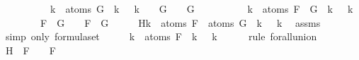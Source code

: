 \begin{isabellebody}
\ \ \ \ \ \ \ \ \ \ {\isachardoublequoteopen}{\isasymforall}k\ {\isasymin}\ atoms\ G{\isachardot}\ {\isasymA}\ k\ {\isacharequal}\ {\isasymA}\ k\ {\isasymLongrightarrow}\ {\isasymA}\ {\isasymTurnstile}\ G\ {\isasymlongleftrightarrow}\ {\isasymA}\ {\isasymTurnstile}\ G{\isachardoublequoteclose}\isanewline
\ \ \ \ \ \ \ \ \ \ {\isachardoublequoteopen}{\isasymforall}k\ {\isasymin}\ atoms\ {\isacharparenleft}F\ \isactrlbold {\isasymrightarrow}\ G{\isacharparenright}{\isachardot}\ {\isasymA}\ k\ {\isacharequal}\ {\isasymA}\ k{\isachardoublequoteclose}\isanewline
\ \ \ \ \ \ {\isachardoublequoteopen}{\isasymA}\ {\isasymTurnstile}\ {\isacharparenleft}F\ \isactrlbold {\isasymrightarrow}\ G{\isacharparenright}\ {\isasymlongleftrightarrow}\ {\isasymA}\ {\isasymTurnstile}\ {\isacharparenleft}F\ \isactrlbold {\isasymrightarrow}\ G{\isacharparenright}{\isachardoublequoteclose}\isanewline
%
\isadelimproof
%
\endisadelimproof
%
\isatagproof
{}\isamarkupfalse%
\ {\isacharminus}\isanewline
\ \ \isamarkupfalse%
\ H{\isacharcolon}{\isachardoublequoteopen}{\isasymforall}k\ {\isasymin}\ atoms\ F\ {\isasymunion}\ atoms\ G{\isachardot}\ {\isasymA}\ k\ {\isacharequal}\ {\isasymA}\ k{\isachardoublequoteclose}\ \isamarkupfalse%
\ assms{\isacharparenleft}{}{\isacharparenright}\isanewline
\ \ \ \ \isamarkupfalse%
\ {\isacharparenleft}simp\ only{\isacharcolon}\ formula{\isachardot}set{\isacharparenleft}{}{\isacharparenright}{\isacharparenright}\isanewline
\ \ \isamarkupfalse%
\ \isamarkupfalse%
\ {\isachardoublequoteopen}{\isasymforall}k\ {\isasymin}\ atoms\ F{\isachardot}\ {\isasymA}\ k\ {\isacharequal}\ {\isasymA}\ k{\isachardoublequoteclose}\isanewline
\ \ \ \ \isamarkupfalse%
\ {\isacharparenleft}rule\ forall{\isacharunderscore}union{}{\isacharparenright}\isanewline
\ \ \isamarkupfalse%
\ \isamarkupfalse%
\ H{}{\isacharcolon}{\isachardoublequoteopen}{\isasymA}\ {\isasymTurnstile}\ F\ {\isasymlongleftrightarrow}\ {\isasymA}\ {\isasymTurnstile}\ F{\isachardoublequoteclose}\isanewline
\ \ \ \ \isamarkupfalse%

\end{isabellebody}
